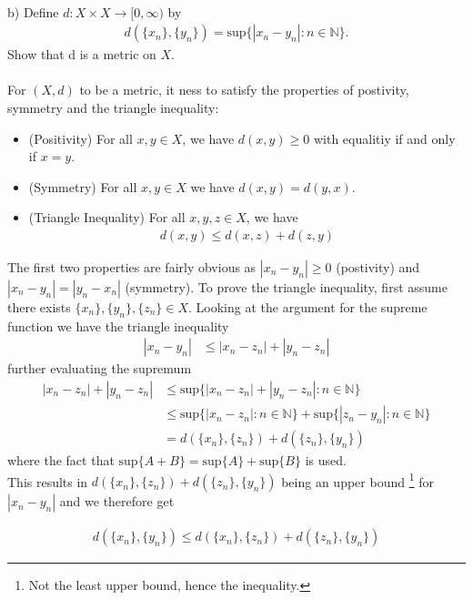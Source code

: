 \documentclass[12pt,letterpaper]{article}
\begin{document}
 
 \noindent \\
 b) Define $d: X \times X \to [0, \infty)$ by
\begin{align*}
 	d(\{x_n\}, \{y_n\}) = \text{sup}\{|x_n-y_n| : n\in \mathbb{N}\}. 
\end{align*}
 Show that d is a metric on $X$.\\
 \noindent \\
For $(X,d)$ to be a metric, it ness to satisfy the properties of postivity, symmetry and the triangle inequality:
 \begin{itemize}
 	\item (Positivity) For all $x,y\in X$, we have $d(x,y)\ge 0$ with equalitiy if and only if $x=y$.
 	\item (Symmetry) For all $x,y \in X$ we have $d(x,y)=d(y,x)$. 
 	\item (Triangle Inequality) For all $x,y,z \in X$, we have
 		\begin{align*}
 			d(x,y) \le d(x,z)+d(z,y)
 		\end{align*}
 \end{itemize}

The first two properties are fairly obvious as $|x_n-y_n|\ge 0$ (postivity) and $|x_n-y_n| = |y_n-x_n|$ (symmetry). To prove the triangle inequality, first assume there exists $\{x_n\},\{y_n\},\{z_n\}\in X$. Looking at the argument for the supreme function we have the triangle inequality
\begin{align*}
	|x_n-y_n| &\le |x_n-z_n| + |y_n - z_n|
\end{align*}
further evaluating the supremum
\begin{align*}
	|x_n-z_n| + |y_n - z_n| &\le  \text{sup} \{|x_n-z_n| + |y_n - z_n|  : n\in\mathbb{N} \} \\
		&\le \text{sup} \{|x_n-z_n| : n\in\mathbb{N} \} +\text{sup} \{| z_n-y_n|  : n\in\mathbb{N} \} \\
		&= d(\{x_n\}, \{z_n\}) + d(\{z_n\}, \{y_n\})
\end{align*}
where the fact that $\text{sup} \{A+B\} = \text{sup} \{A\} + \text{sup} \{B\}$ is used. \\
This results in $d(\{x_n\}, \{z_n\}) + d(\{z_n\}, \{y_n\})$ being an upper bound \footnote{Not the least upper bound, hence the inequality.} for $|x_n-y_n|$ and we therefore get

 \begin{align*}
	 d(\{x_n\}, \{y_n\}) \le d(\{x_n\}, \{z_n\}) + d(\{z_n\}, \{y_n\})
\end{align*}
\end{document}
